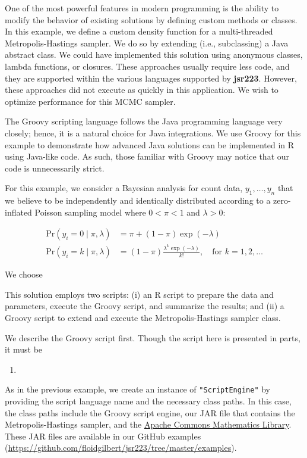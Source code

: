 \documentclass[
article,
11pt, %
a4paper, %
oneside, %
headinclude,footinclude, %
]{scrartcl}
\theoremstyle{definition} %
\theoremstyle{plain} %
\theoremstyle{remark} %
\newcommand{\pkg}[1]{\textbf{#1}}
\newcommand{\code}[1]{\texttt{#1}}
\begin{document}
One of the most powerful features in modern programming is the ability to modify the behavior of existing solutions by defining custom methods or classes. In this example, we define a custom density function for a multi-threaded Metropolis-Hastings sampler. We do so by extending (i.e., subclassing) a Java abstract class. We could have implemented this solution using anonymous classes, lambda functions, or closures. These approaches usually require less code, and they are supported within the various languages supported by \pkg{jsr223}. However, these approaches did not execute as quickly in this application. We wish to optimize performance for this MCMC sampler.

The Groovy scripting language follows the Java programming language very closely; hence, it is a natural choice for Java integrations. We use Groovy for this example to demonstrate how advanced Java solutions can be implemented in R using Java-like code. As such, those familiar with Groovy may notice that our code is unnecessarily strict.

For this example, we consider a Bayesian analysis for count data, $y_1,\dots,y_n$ that we believe to be independently and identically distributed according to a zero-inflated Poisson sampling model where $0 < \pi < 1$ and $\lambda > 0$:

\begin{align*}
\text{Pr}(y_i = 0 \mid \pi, \lambda) &= \pi + (1-\pi) \exp(-\lambda) \\
\text{Pr}(y_i = k \mid \pi, \lambda) &= (1  -\pi) \frac{\lambda^k \exp(-\lambda)}{k!}, \quad \text{for } k = 1, 2, \ldots
\end{align*}

We choose 

This solution employs two scripts: (i) an R script to prepare the data and parameters, execute the Groovy script, and summarize the results; and (ii) a Groovy script to extend and execute the Metropolis-Hastings sampler class.

We describe the Groovy script first. Though the script here is presented in parts, it must be 

\begin{enumerate}
\item 
\end{enumerate}

As in the previous example, we create an instance of \code{"ScriptEngine"} by providing the script language name and the necessary class paths. In this case, the class paths include the Groovy script engine, our JAR file that contains the Metropolis-Hastings sampler, and the \href{http://commons.apache.org/proper/commons-math/}{Apache Commons Mathematics Library}. These JAR files are available in our GitHub examples (\url{https://github.com/floidgilbert/jsr223/tree/master/examples}).
\end{document}
